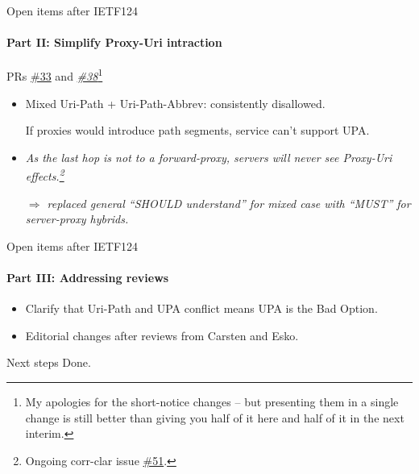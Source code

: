\begin{frame}{Open items after IETF124}\Large
  \framesubtitle{Part II: Simplify Proxy-Uri intraction}

  PRs \href{https://github.com/core-wg/uri-path-abbrev/issues/33}{\#33} and \href{https://github.com/core-wg/uri-path-abbrev/issues/38}{\textit{\#38}}\footnote{\label{yester}My apologies for the short-notice changes -- but presenting them in a single change is still better than giving you half of it here and half of it in the next interim.}
  
  \begin{itemize}
    \item Mixed Uri-Path + Uri-Path-Abbrev: consistently disallowed.


      If proxies would introduce path segments,
      service can't support UPA.
    \item \textit{As the last hop is not to a forward-proxy, servers will never see Proxy-Uri effects.\footnote{Ongoing corr-clar issue \href{https://github.com/core-wg/corrclar/issues/51}{\#51}.}}
      \bigskip

      \textit{$\Rightarrow$ replaced general ``SHOULD understand'' for mixed case with ``MUST'' for server-proxy hybrids.}
  \end{itemize}
\end{frame}

\begin{frame}{Open items after IETF124}\Large
  \framesubtitle{Part III: Addressing reviews}
  \begin{itemize}
    \item Clarify that Uri-Path and UPA conflict means UPA is the Bad Option.
    \item Editorial changes after reviews from Carsten and Esko.
  \end{itemize}
\end{frame}

\begin{frame}{Next steps}\Huge
  Done.
\end{frame}

